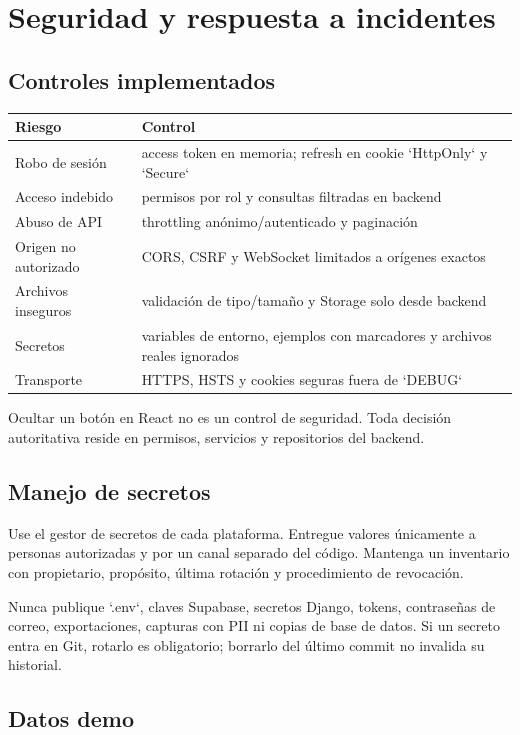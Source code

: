 \chapter{Seguridad y respuesta a incidentes}

\section{Controles implementados}

\begin{tabularx}{\textwidth}{@{}L{0.25\textwidth}Y@{}}
\toprule
\textbf{Riesgo} & \textbf{Control}\\
\midrule
Robo de sesión & access token en memoria; refresh en cookie `HttpOnly` y `Secure`\\
Acceso indebido & permisos por rol y consultas filtradas en backend\\
Abuso de API & throttling anónimo/autenticado y paginación\\
Origen no autorizado & CORS, CSRF y WebSocket limitados a orígenes exactos\\
Archivos inseguros & validación de tipo/tamaño y Storage solo desde backend\\
Secretos & variables de entorno, ejemplos con marcadores y archivos reales ignorados\\
Transporte & HTTPS, HSTS y cookies seguras fuera de `DEBUG`\\
\bottomrule
\end{tabularx}

Ocultar un botón en React no es un control de seguridad. Toda decisión autoritativa reside en
permisos, servicios y repositorios del backend.

\section{Manejo de secretos}

Use el gestor de secretos de cada plataforma. Entregue valores únicamente a personas autorizadas y
por un canal separado del código. Mantenga un inventario con propietario, propósito, última rotación
y procedimiento de revocación.

Nunca publique `.env`, claves Supabase, secretos Django, tokens, contraseñas de correo, exportaciones,
capturas con PII ni copias de base de datos. Si un secreto entra en Git, rotarlo es obligatorio;
borrarlo del último commit no invalida su historial.

\section{Datos demo}

